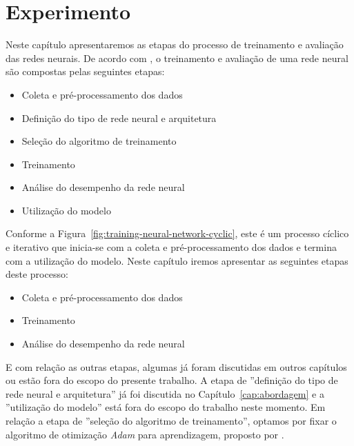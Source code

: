 \chapter{Experimento}
\label{cap:experimento}


Neste capítulo apresentaremos as etapas do processo de treinamento e avaliação das redes neurais. De acordo com \cite{nndesign:2014:pratical-training-issues}, o treinamento e avaliação de uma rede neural são compostas pelas seguintes etapas:
\begin{itemize}
    \item Coleta e pré-processamento dos dados
    \item Definição do tipo de rede neural e arquitetura
    \item Seleção do algoritmo de treinamento
    \item Treinamento
    \item Análise do desempenho da rede neural
    \item Utilização do modelo
\end{itemize}

Conforme a Figura~\ref{fig:training-neural-network-cyclic}, este é um processo cíclico e iterativo que inicia-se com a coleta e pré-processamento dos dados e termina com a utilização do modelo. Neste capítulo iremos apresentar as seguintes etapas deste processo:

\begin{itemize}
    \item Coleta e pré-processamento dos dados
    \item Treinamento
    \item Análise do desempenho da rede neural
\end{itemize}

E com relação as outras etapas, algumas já foram discutidas em outros capítulos ou estão fora do escopo do presente trabalho. A etapa de ''definição do tipo de rede neural e arquitetura'' já foi discutida no Capítulo~\ref{cap:abordagem} e a ''utilização do modelo'' está fora do escopo do trabalho neste momento. Em relação a etapa de ''seleção do algoritmo de treinamento'', optamos por fixar o algoritmo de otimização \emph{Adam} para aprendizagem, proposto por \cite{yao-2018}. 



